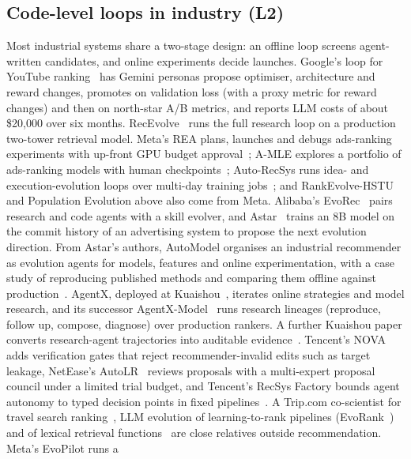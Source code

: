 \documentclass[sigconf,nonacm]{acmart}
\begin{document}
\subsection{Code-level loops in industry (L2)}
Most industrial systems share a two-stage design: an offline loop screens agent-written candidates, and online
experiments decide launches. Google's loop for YouTube ranking~\cite{wang2026selfevolving} has Gemini personas
propose optimiser, architecture and reward changes, promotes on validation loss (with a proxy metric for reward changes) and then on north-star A/B
metrics, and reports LLM costs of about \$20{,}000 over six months. RecEvolve~\cite{pan2026recevolve} runs the full
research loop on a production two-tower retrieval model. Meta's REA plans, launches and debugs ads-ranking
experiments with up-front GPU budget approval~\cite{meta2026rea}; A-MLE explores a portfolio of ads-ranking models
with human checkpoints~\cite{gao2026amle}; Auto-RecSys runs idea- and execution-evolution loops over multi-day training
jobs~\cite{li2026autorecsys}; and RankEvolve-HSTU and Population Evolution above also come from Meta. Alibaba's
EvoRec~\cite{mu2026evorec} pairs research and code agents with a skill evolver, and Astar~\cite{hu2026astar} trains an
8B model on the commit history of an advertising system to propose the next evolution direction. From Astar's
authors, AutoModel organises an industrial recommender as evolution agents for models, features and online
experimentation, with a case study of reproducing published methods and comparing them offline against
production~\cite{zhang2026agenticrs}. AgentX, deployed at Kuaishou~\cite{lao2026agentx}, iterates online strategies and model research, and its successor
AgentX-Model~\cite{yang2026agentxmodel} runs research lineages (reproduce, follow up, compose, diagnose) over production
rankers. A further Kuaishou paper converts research-agent trajectories
into auditable evidence~\cite{zhuang2026trajectories}. Tencent's NOVA~\cite{liu2026nova} adds verification gates that
reject recommender-invalid edits such as target leakage, NetEase's AutoLR~\cite{zhang2026autolr} reviews proposals with
a multi-expert proposal council under a limited trial budget, and Tencent's RecSys Factory bounds agent autonomy to typed decision points
in fixed pipelines~\cite{ao2026recsysfactory}. A Trip.com co-scientist for travel search ranking~\cite{wu2026coscientist},
LLM evolution of learning-to-rank pipelines (EvoRank~\cite{patel2026evorank}) and of lexical retrieval
functions~\cite{nian2026rankevolveir} are close relatives outside recommendation. Meta's EvoPilot runs a
\end{document}

